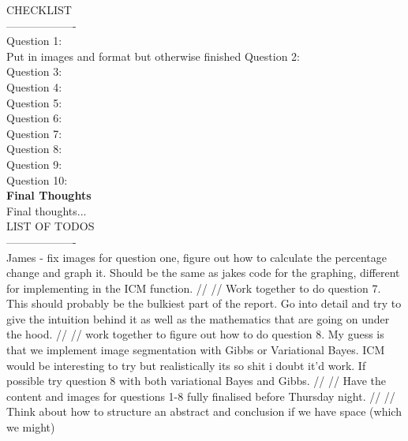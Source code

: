\documentclass[10pt, a4paper, twocolumn]{article} %
\begin{document}








CHECKLIST\\
-------------------\\
Question 1:\\ Put in images and format but otherwise finished
Question 2:\\
Question 3:\\
Question 4:\\
Question 5:\\
Question 6:\\
Question 7:\\
Question 8:\\
Question 9:\\
Question 10:\\
\textbf{Final Thoughts}\\
Final thoughts...\\

LIST OF TODOS\\
-------------------\\
James - fix images for question one, figure out how to calculate the percentage change and graph it. Should be the same as jakes code for the graphing, different for implementing in the ICM function.
//
//
Work together to do question 7. This should probably be the bulkiest part of the report. Go into detail and try to give the intuition behind it as well as the mathematics that are going on under the hood.
//
//
work together to figure out how to do question 8. My guess is that we implement image segmentation with Gibbs or Variational Bayes. ICM would be interesting to try but realistically its so shit i doubt it'd work. If possible try question 8 with both variational Bayes and Gibbs. 
//
//
Have the content and images for questions 1-8 fully finalised before Thursday night. 
//
//
Think about how to structure an abstract and conclusion if we have space (which we might)

\printbibliography[title={Bibliography}] %

\end{document}
